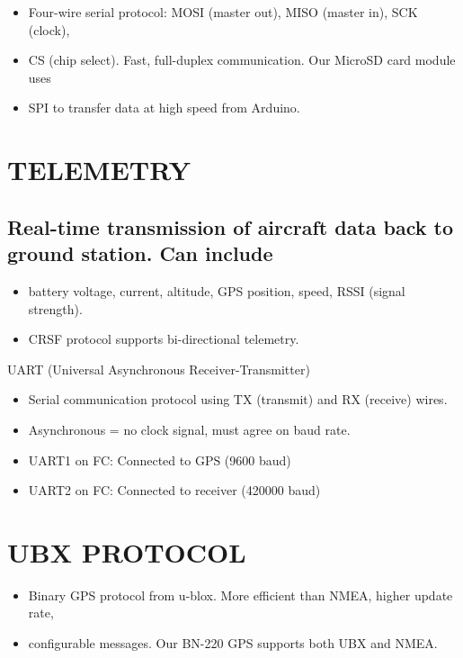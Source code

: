 \documentclass[11pt,letterpaper]{article}
\begin{document}
\begin{itemize}
  \item Four-wire serial protocol: MOSI (master out), MISO (master in), SCK (clock),
  \item CS (chip select). Fast, full-duplex communication. Our MicroSD card module uses
  \item SPI to transfer data at high speed from Arduino.
\end{itemize}

\section{TELEMETRY}

\subsection{Real-time transmission of aircraft data back to ground station. Can include}

\begin{itemize}
  \item battery voltage, current, altitude, GPS position, speed, RSSI (signal strength).
  \item CRSF protocol supports bi-directional telemetry.
\end{itemize}

UART (Universal Asynchronous Receiver-Transmitter)\par

\begin{itemize}
  \item Serial communication protocol using TX (transmit) and RX (receive) wires.
  \item Asynchronous = no clock signal, must agree on baud rate.
  \item UART1 on FC: Connected to GPS (9600 baud)
  \item UART2 on FC: Connected to receiver (420000 baud)
\end{itemize}

\section{UBX PROTOCOL}

\begin{itemize}
  \item Binary GPS protocol from u-blox. More efficient than NMEA, higher update rate,
  \item configurable messages. Our BN-220 GPS supports both UBX and NMEA.
\end{itemize}
\end{document}
